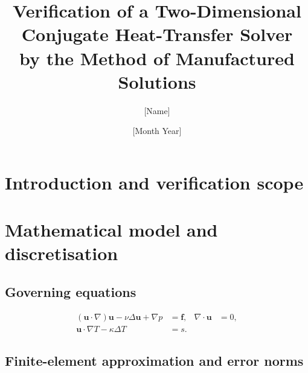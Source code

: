 \documentclass[11pt,a4paper]{article}
\title{Verification of a Two-Dimensional Conjugate Heat-Transfer Solver\\
       by the Method of Manufactured Solutions}
\author{[Name]}
\date{[Month Year]}
\begin{document}
\maketitle

\begin{abstract}
\end{abstract}

\section{Introduction and verification scope}

\section{Mathematical model and discretisation}
\subsection{Governing equations}
\begin{align}
  (\bm{u}\cdot\nabla)\bm{u}-\nu\Delta\bm{u}+\nabla p &= \bm{f},
  & \nabla\cdot\bm{u} &= 0, \\
  \bm{u}\cdot\nabla T-\kappa\Delta T &= s.
\end{align}

\subsection{Finite-element approximation and error norms}
\end{document}
